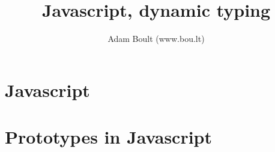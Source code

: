\documentclass[oneside]{book}
\begin{document}
\author{Adam Boult (www.bou.lt)}
\title{Javascript, dynamic typing}
\maketitle

\setcounter{tocdepth}{0}
\tableofcontents



\part{Javascript}


\part{Prototypes in Javascript}
\end{document}
